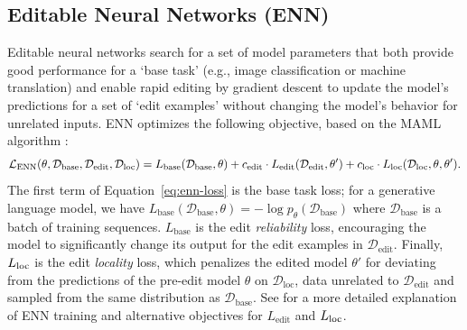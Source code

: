 
\subsection{Editable Neural Networks (ENN)}
Editable neural networks \citep{Sinitsin2020Editable} search for a set of model parameters that both provide good performance for a `base task' (e.g., image classification or machine translation) and enable rapid editing by gradient descent to update the model's predictions for a set of `edit examples' without changing the model's behavior for unrelated inputs. ENN optimizes the following objective, based on the MAML algorithm \citep{finn2017maml}:
\begin{align}
    \mathcal{L}_\text{ENN}(\theta, \mathcal{D}_\text{base}, \mathcal{D}_\text{edit}, \mathcal{D}_\text{loc}) =  L_\text{base}(\mathcal{D}_\text{base}, \theta) + c_\text{edit}\cdot L_\text{edit}(\mathcal{D}_\text{edit}, \theta^\prime) + c_\text{loc}\cdot L_\text{loc}(\mathcal{D}_\text{loc}, \theta, \theta^\prime).\label{eq:enn-loss}
\end{align}
The first term of Equation~\ref{eq:enn-loss} is the base task loss; for a generative language model, we have $ L_\text{base}(\mathcal{D}_\text{base}, \theta) = -\log p_{\theta}(\mathcal{D}_\text{base})$ where $\mathcal{D}_\text{base}$ is a batch of training sequences. $ L_\text{base}$ is the edit \textit{reliability} loss, encouraging the model to significantly change its output for the edit examples in $\mathcal{D}_\text{edit}$. Finally, $L_\text{loc}$ is the edit \textit{locality} loss, which penalizes the edited model $\theta'$ for deviating from the predictions of the pre-edit model $\theta$ on $\mathcal{D}_\text{loc}$, data unrelated to $\mathcal{D}_\text{edit}$ and sampled from the same distribution as $\mathcal{D}_\text{base}$. See \citet{Sinitsin2020Editable} for a more detailed explanation of ENN training and alternative objectives for $ L_\text{edit}$ and $ L_\text{loc}$.

